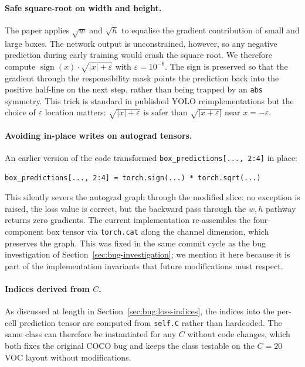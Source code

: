 \paragraph{Safe square-root on width and height.} The paper applies
$\sqrt{w}$ and $\sqrt{h}$ to equalise the gradient contribution of small and
large boxes. The network output is unconstrained, however, so any negative
prediction during early training would crash the square root. We therefore
compute $\operatorname{sign}(x) \cdot \sqrt{|x| + \varepsilon}$ with
$\varepsilon = 10^{-6}$. The sign is preserved so that the gradient through
the responsibility mask points the prediction back into the positive half-line
on the next step, rather than being trapped by an \texttt{abs} symmetry. This
trick is standard in published YOLO reimplementations but the choice of
$\varepsilon$ location matters: $\sqrt{|x| + \varepsilon}$ is safer than
$\sqrt{|x + \varepsilon|}$ near $x = -\varepsilon$.

\paragraph{Avoiding in-place writes on autograd tensors.} An earlier version
of the code transformed \texttt{box\_predictions[..., 2:4]} in place:
\begin{lstlisting}
box_predictions[..., 2:4] = torch.sign(...) * torch.sqrt(...)
\end{lstlisting}
\noindent This silently severs the autograd graph through the modified slice:
no exception is raised, the loss value is correct, but the backward pass
through the $w, h$ pathway returns zero gradients. The current implementation
re-assembles the four-component box tensor via \texttt{torch.cat} along the
channel dimension, which preserves the graph. This was fixed in the same
commit cycle as the bug investigation of
Section~\ref{sec:bug-investigation}; we mention it here because it is part of
the implementation invariants that future modifications must respect.

\paragraph{Indices derived from $C$.} As discussed at length in
Section~\ref{sec:bug:loss-indices}, the indices into the per-cell prediction
tensor are computed from \texttt{self.C} rather than hardcoded. The same
class can therefore be instantiated for any $C$ without code changes, which
both fixes the original COCO bug and keeps the class testable on the
$C\!=\!20$ VOC layout without modifications.

